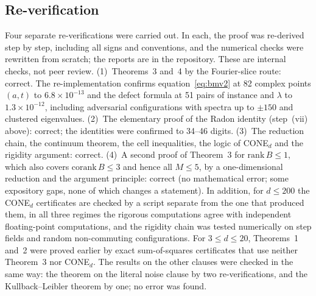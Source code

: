 \documentclass[11pt]{article}
\begin{document}
\subsection*{Re-verification}
Four separate re-verifications were carried out. In each, the proof was re-derived step by step, including all signs and
conventions, and the numerical checks were rewritten from scratch; the reports are in the repository. These are internal
checks, not peer review. (1)~Theorems~3 and~4 by the Fourier-slice route: correct. The re-implementation confirms
equation~\eqref{eq:bmv2} at 82 complex points $(a,t)$ to $6.8\times10^{-13}$ and the defect formula at 51 pairs of
instance and $\lambda$ to $1.3\times10^{-12}$, including adversarial configurations with spectra up to $\pm150$ and
clustered eigenvalues. (2)~The elementary proof of the Radon identity (step~(vii) above): correct; the identities were
confirmed to 34--46 digits. (3)~The reduction chain, the continuum theorem, the cell inequalities, the logic of
CONE$_d$ and the rigidity argument: correct. (4)~A second proof of Theorem~3 for $\mathrm{rank}\,B\le1$, which also
covers $\mathrm{corank}\,B\le3$ and hence all $M\le5$, by a one-dimensional reduction and the argument principle:
correct (no mathematical error; some expository gaps, none of which changes a statement). In addition, for $d\le200$ the CONE$_d$ certificates are checked by a script separate from the one that
produced them, in all three regimes the rigorous computations agree with independent floating-point computations, and
the rigidity chain was tested numerically on step fields and random non-commuting configurations. For $3\le d\le20$,
Theorems~1 and~2 were proved earlier by exact sum-of-squares certificates that use neither Theorem~3 nor
CONE$_d$\cite{repoCGLMP}. The results on the other clauses were checked in the same way: the theorem on the
literal noise clause by two re-verifications, and the Kullback--Leibler theorem by one; no error was found.
\end{document}
